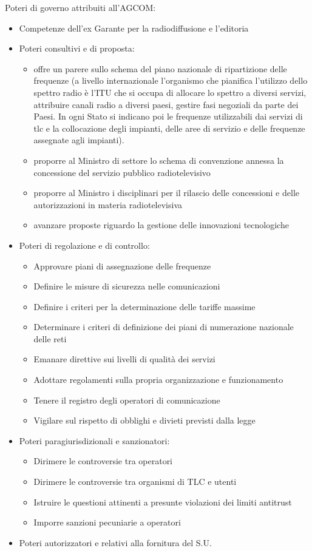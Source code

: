 Poteri di governo attribuiti all'AGCOM:
\begin{itemize}
    \item Competenze dell'ex Garante per la radiodiffusione e l'editoria
    \item Poteri consultivi e di proposta:
    \begin{itemize}
        \item offre un parere sullo schema del piano nazionale di ripartizione delle frequenze (a livello internazionale l'organismo che pianifica l'utilizzo dello spettro radio è l'ITU che si occupa di allocare lo spettro a diversi servizi, attribuire canali radio a diversi paesi, gestire fasi negoziali da parte dei Paesi. In ogni Stato si indicano poi le frequenze utilizzabili dai servizi di tlc e la collocazione degli impianti, delle aree di servizio e delle frequenze assegnate agli impianti).
        \item proporre al Ministro di settore lo schema di convenzione annessa la concessione del servizio pubblico radiotelevisivo
        \item proporre al Ministro i disciplinari per il rilascio delle concessioni e delle autorizzazioni in materia radiotelevisiva
        \item avanzare proposte riguardo la gestione delle innovazioni tecnologiche
    \end{itemize}
    \item Poteri di regolazione e di controllo:
    \begin{itemize}
        \item Approvare piani di assegnazione delle frequenze
        \item Definire le misure di sicurezza nelle comunicazioni
        \item Definire i criteri per la determinazione delle tariffe massime
        \item Determinare i criteri di definizione dei piani di numerazione nazionale delle reti
        \item Emanare direttive sui livelli di qualità dei servizi
        \item Adottare regolamenti sulla propria organizzazione e funzionamento
        \item Tenere il registro degli operatori di comunicazione
        \item Vigilare sul rispetto di obblighi e divieti previsti dalla legge
    \end{itemize}
    \item Poteri paragiurisdizionali e sanzionatori:
    \begin{itemize}
        \item Dirimere le controversie tra operatori
        \item Dirimere le controversie tra organismi di TLC e utenti
        \item Istruire le questioni attinenti a presunte violazioni dei limiti antitrust
        \item Imporre sanzioni pecuniarie a operatori
    \end{itemize}
    \item Poteri autorizzatori e relativi alla fornitura del S.U.
\end{itemize}

